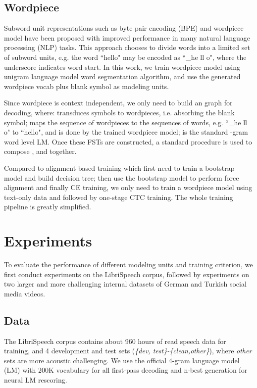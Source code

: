 \documentclass[a4paper]{article}
\begin{document}
\subsection{Wordpiece}
\label{sec:wordpiece}

Subword unit representations such as byte pair encoding (BPE)\cite{sennrich2016neural} and wordpiece model\cite{WuSCLNMKCGMKSJL16} have been proposed with improved performance in many natural language processing (NLP) tasks. This approach chooses to divide words into a limited set of subword units, e.g. the word ``hello" may be encoded as ``\_he ll o", where the underscore indicates word start. In this work, we train wordpiece model using unigram language model word segmentation algorithm\cite{kudo2018subword}, and use the generated wordpiece vocab plus blank symbol as modeling units.

Since wordpiece is context independent, we only need to build an  graph for decoding, where:  transduces  symbols to  wordpieces, i.e. absorbing the blank symbol;  maps the sequence of wordpieces to the sequences of words, e.g. ``\_he ll o" to ``hello", and is done by the trained wordpiece model;  is the standard -gram word level LM. Once these FSTs are constructed, a standard procedure is used to compose ,  and  together. 

Compared to alignment-based training which first need to train a bootstrap model and build decision tree; then use the bootstrap model to perform force alignment and finally CE training, we only need to train a wordpiece model using text-only data and followed by one-stage CTC training. The whole training pipeline is greatly simplified.

\section{Experiments}
\label{sec:exp}
To evaluate the performance of different modeling units and training criterion, we first conduct experiments on the LibriSpeech corpus\cite{panayotov2015librispeech}, followed by experiments on two larger and more challenging internal datasets of German and Turkish social media videos.

\subsection{Data}
\label{sec:dataset}
The LibriSpeech corpus contains about 960 hours of read speech data for training, and 4 development and test sets (\emph{\{dev, test\}-\{clean,other\}}), where \emph{other} sets are more acoustic challenging. We use the official 4-gram language model (LM) with 200K vocabulary for all first-pass decoding and n-best generation for neural LM rescoring. 
\end{document}
